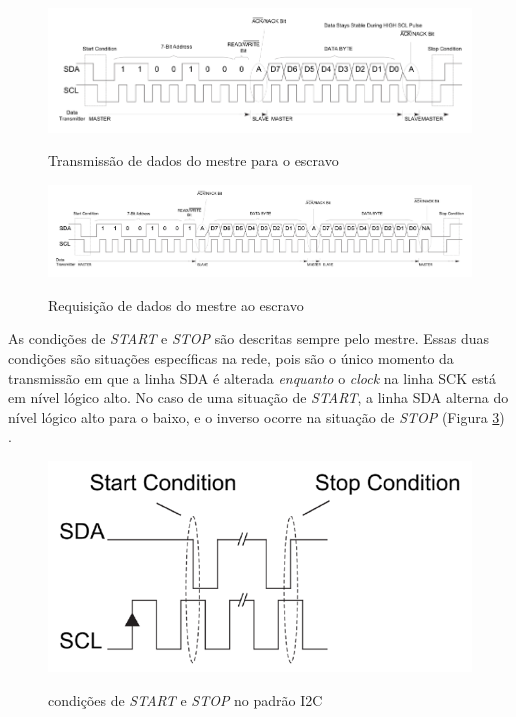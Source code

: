 \begin{figure}[!htb]
	\centering
	\caption{Transmissão de dados do mestre para o escravo}
	\includegraphics[width=1\linewidth]{figuras/i2cwrite}
	\label{fig:i2cwrite}
\end{figure}

\begin{figure}[!htb]
	\centering
	\caption{Requisição de dados do mestre ao escravo}
	\includegraphics[width=1\linewidth]{figuras/i2cread}
	\label{fig:i2cread}
\end{figure}


As condições de \textit{START} e \textit{STOP} são descritas sempre pelo mestre. Essas duas condições são situações específicas na rede, pois são o único momento da transmissão em que a linha SDA é alterada \textit{enquanto} o \textit{clock} na linha SCK está em nível lógico alto. No caso de uma situação de \textit{START}, a linha SDA alterna do nível lógico alto para o baixo, e o inverso ocorre na situação de \textit{STOP} (Figura \ref{fig:startstopconditioni2c}) \cite{site:analogI2c}.

\begin{figure}[!htb]
	\centering
	\caption{condições de \textit{START} e \textit{STOP} no padrão I2C}
	\includegraphics[width=0.65\linewidth]{figuras/startstopconditioni2c}
	\label{fig:startstopconditioni2c}
\end{figure}


